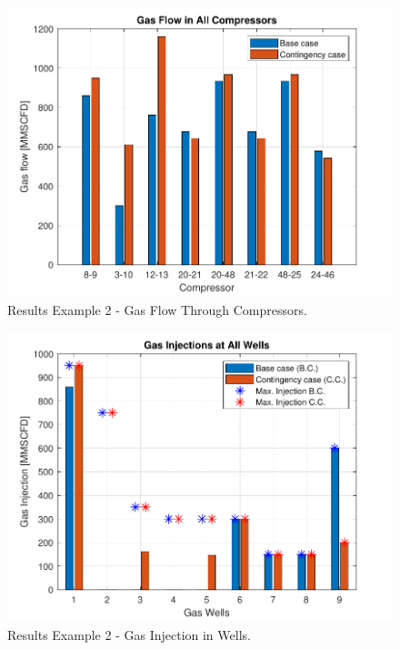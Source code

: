 \begin{figure}[H]
\centering
\includegraphics[scale=0.8]{Figures/ex2_fgc}
\caption{Results Example 2 - Gas Flow Through Compressors.}
\label{fig:ex2_fgc}
\end{figure}

\begin{figure}[H]
\centering
\includegraphics[scale=0.8]{Figures/ex2_inj}
\caption{Results Example 2 - Gas Injection in Wells.}
\label{fig:ex2_inj}
\end{figure}

